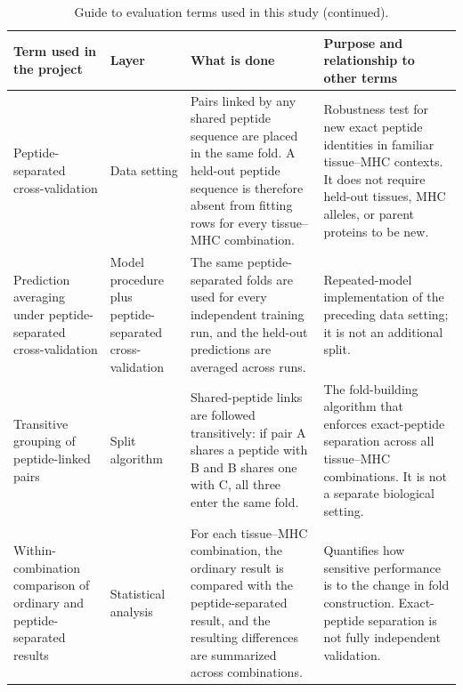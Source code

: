 \begin{table}[t]
\ContinuedFloat
\centering
\caption[]{Guide to evaluation terms used in this study (continued).}
\fontsize{7.5}{8.5}\selectfont
\setlength{\tabcolsep}{1.5pt}
\begin{tabular}{@{}>{\raggedright\arraybackslash}p{2.25cm}
                    >{\raggedright\arraybackslash}p{1.6cm}
                    >{\raggedright\arraybackslash}p{3.75cm}
                    >{\raggedright\arraybackslash}p{3.75cm}@{}}
\toprule
Term used in the project & Layer & What is done & Purpose and relationship to other terms \\
\midrule
Peptide-separated cross-validation
& Data setting
& Pairs linked by any shared peptide sequence are placed in the same fold. A held-out peptide sequence is therefore absent from fitting rows for every tissue--MHC combination.
& Robustness test for new exact peptide identities in familiar tissue--MHC contexts. It does not require held-out tissues, MHC alleles, or parent proteins to be new. \\
\midrule
Prediction averaging under peptide-separated cross-validation
& Model procedure plus peptide-separated cross-validation
& The same peptide-separated folds are used for every independent training run, and the held-out predictions are averaged across runs.
& Repeated-model implementation of the preceding data setting; it is not an additional split. \\
\midrule
Transitive grouping of peptide-linked pairs
& Split algorithm
& Shared-peptide links are followed transitively: if pair A shares a peptide with B and B shares one with C, all three enter the same fold.
& The fold-building algorithm that enforces exact-peptide separation across all tissue--MHC combinations. It is not a separate biological setting. \\
\midrule
Within-combination comparison of ordinary and peptide-separated results
& Statistical analysis
& For each tissue--MHC combination, the ordinary result is compared with the peptide-separated result, and the resulting differences are summarized across combinations.
& Quantifies how sensitive performance is to the change in fold construction. Exact-peptide separation is not fully independent validation. \\
\bottomrule
\end{tabular}
\end{table}

